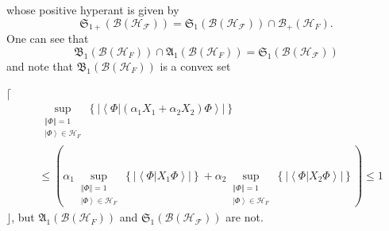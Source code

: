 \documentclass[aps,preprint]{revtex4}%
\begin{document}
whose positive hyperant is given by
\begin{equation}
\mathfrak{S}_{1+}\left(  \mathcal{B}\left(  \mathcal{H}_{\mathcal{F}}\right)
\right)  =\mathfrak{S}_{1}\left(  \mathcal{B}\left(  \mathcal{H}_{\mathcal{F}%
}\right)  \right)  \cap\mathcal{B}_{+}\left(  \mathcal{H}_{F}\right)  .
\end{equation}
One can see that
\begin{equation}
\mathfrak{B}_{1}\left(  \mathcal{B}\left(  \mathcal{H}_{F}\right)  \right)
\cap\mathfrak{A}_{1}\left(  \mathcal{B}\left(  \mathcal{H}_{F}\right)
\right)  =\mathfrak{S}_{1}\left(  \mathcal{B}\left(  \mathcal{H}_{\mathcal{F}%
}\right)  \right)
\end{equation}
and note that $\mathfrak{B}_{1}\left(  \mathcal{B}\left(  \mathcal{H}%
_{F}\right)  \right)  $ is a convex set

$\lceil$%
\begin{align}
&  \sup_{\substack{\left\Vert \Phi\right\Vert =1\\\left\vert \Phi\right\rangle
\in\mathcal{H}_{F}}}\left\{  \left\vert \left\langle \left.  \Phi\right\vert
\left(  \alpha_{1}X_{1}+\alpha_{2}X_{2}\right)  \Phi\right\rangle \right\vert
\right\} \nonumber\\
&  \leq\left(  \alpha_{1}\sup_{\substack{\left\Vert \Phi\right\Vert
=1\\\left\vert \Phi\right\rangle \in\mathcal{H}_{F}}}\left\{  \left\vert
\left\langle \left.  \Phi\right\vert X_{1}\Phi\right\rangle \right\vert
\right\}  +\alpha_{2}\sup_{\substack{\left\Vert \Phi\right\Vert =1\\\left\vert
\Phi\right\rangle \in\mathcal{H}_{F}}}\left\{  \left\vert \left\langle \left.
\Phi\right\vert X_{2}\Phi\right\rangle \right\vert \right\}  \right)  \leq1
\end{align}
$\rfloor$, but $\mathfrak{A}_{1}\left(  \mathcal{B}\left(  \mathcal{H}%
_{F}\right)  \right)  $ and $\mathfrak{S}_{1}\left(  \mathcal{B}\left(
\mathcal{H}_{\mathcal{F}}\right)  \right)  $ are not.
\end{document}
